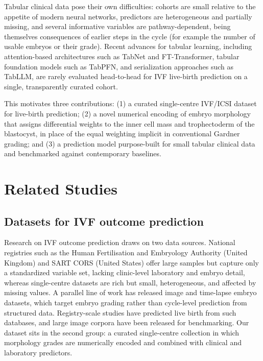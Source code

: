 \documentclass[12pt,a4paper]{article}
\begin{document}
Tabular clinical data pose their own difficulties: cohorts are small relative to the appetite of modern neural networks, predictors are heterogeneous and partially missing, and several informative variables are pathway-dependent, being themselves consequences of earlier steps in the cycle (for example the number of usable embryos or their grade). Recent advances for tabular learning, including attention-based architectures such as TabNet and FT-Transformer, tabular foundation models such as TabPFN, and serialization approaches such as TabLLM,\cite{tabnet,fttrans,tabpfnIclr,tabllm} are rarely evaluated head-to-head for IVF live-birth prediction on a single, transparently curated cohort.

This motivates three contributions: (1) a curated single-centre IVF/ICSI dataset for live-birth prediction; (2) a novel numerical encoding of embryo morphology that assigns differential weights to the inner cell mass and trophectoderm of the blastocyst, in place of the equal weighting implicit in conventional Gardner grading; and (3) a prediction model purpose-built for small tabular clinical data and benchmarked against contemporary baselines.



\section*{Related Studies}

\subsection*{Datasets for IVF outcome prediction}

Research on IVF outcome prediction draws on two data sources. National registries such as the Human Fertilisation and Embryology Authority (United Kingdom) and SART CORS (United States) offer large samples but capture only a standardized variable set, lacking clinic-level laboratory and embryo detail,\cite{hfea,sartCors,kupka} whereas single-centre datasets are rich but small, heterogeneous, and affected by missing values. A parallel line of work has released image and time-lapse embryo datasets,\cite{gomez,annotatedBlast,theilgaard} which target embryo grading rather than cycle-level prediction from structured data. Registry-scale studies have predicted live birth from such databases,\cite{naturalCycle,huang} and large image corpora have been released for benchmarking.\cite{artDataset,femi} Our dataset sits in the second group: a curated single-centre collection in which morphology grades are numerically encoded and combined with clinical and laboratory predictors.
\end{document}
